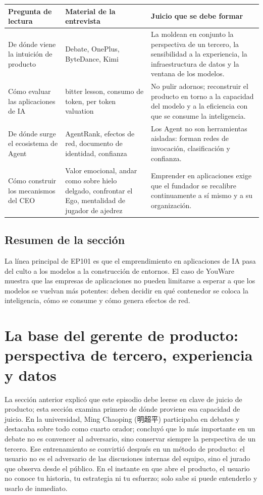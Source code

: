 \documentclass[a4paper]{article}
\begin{document}
\noindent\begin{tabularx}{\textwidth}{p{}p{}X}
\toprule
Pregunta de lectura & Material de la entrevista & Juicio que se debe formar \\
\midrule
De dónde viene la intuición de producto & Debate, OnePlus, ByteDance, Kimi & La moldean en conjunto la perspectiva de un tercero, la sensibilidad a la experiencia, la infraestructura de datos y la ventana de los modelos. \\
Cómo evaluar las aplicaciones de IA & bitter lesson, consumo de token, per token valuation & No pulir adornos; reconstruir el producto en torno a la capacidad del modelo y a la eficiencia con que se consume la inteligencia. \\
De dónde surge el ecosistema de Agent & AgentRank, efectos de red, documento de identidad, confianza & Los Agent no son herramientas aisladas: forman redes de invocación, clasificación y confianza. \\
Cómo construir los mecanismos del CEO & Valor emocional, andar como sobre hielo delgado, confrontar el Ego, mentalidad de jugador de ajedrez & Emprender en aplicaciones exige que el fundador se recalibre continuamente a sí mismo y a su organización. \\
\bottomrule
\end{tabularx}

\subsection{Resumen de la sección}

La línea principal de EP101 es que el emprendimiento en aplicaciones de IA pasa del culto a los modelos a la construcción de entornos. El caso de YouWare muestra que las empresas de aplicaciones no pueden limitarse a esperar a que los modelos se vuelvan más potentes: deben decidir en qué contenedor se coloca la inteligencia, cómo se consume y cómo genera efectos de red.
\section{La base del gerente de producto: perspectiva de tercero, experiencia y datos}

La sección anterior explicó que este episodio debe leerse en clave de juicio de producto; esta sección examina primero de dónde proviene esa capacidad de juicio. En la universidad, Ming Chaoping (明超平) participaba en debates y destacaba sobre todo como cuarto orador; concluyó que lo más importante en un debate no es convencer al adversario, sino conservar siempre la perspectiva de un tercero. Ese entrenamiento se convirtió después en un método de producto: el usuario no es el adversario de las discusiones internas del equipo, sino el jurado que observa desde el público. En el instante en que abre el producto, el usuario no conoce tu historia, tu estrategia ni tu esfuerzo; solo sabe si puede entenderlo y usarlo de inmediato.
\end{document}
